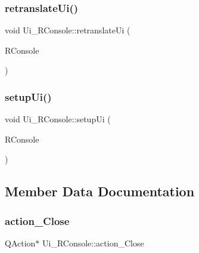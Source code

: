 \subsubsection{\texorpdfstring{retranslateUi()}{retranslateUi()}}
{\footnotesize\ttfamily void Ui\+\_\+\+R\+Console\+::retranslate\+Ui (\begin{DoxyParamCaption}\item[{Q\+Main\+Window $\ast$}]{R\+Console }\end{DoxyParamCaption})\hspace{0.3cm}{\ttfamily [inline]}}

\mbox{\label{class_ui___r_console_a2df0458dc50701360bbf16f2c7e4b7e4}} 
\subsubsection{\texorpdfstring{setupUi()}{setupUi()}}
{\footnotesize\ttfamily void Ui\+\_\+\+R\+Console\+::setup\+Ui (\begin{DoxyParamCaption}\item[{Q\+Main\+Window $\ast$}]{R\+Console }\end{DoxyParamCaption})\hspace{0.3cm}{\ttfamily [inline]}}



\subsection{Member Data Documentation}
\mbox{\label{class_ui___r_console_a9e3d3ed4bf54512777f789cbb07904d2}} 
\subsubsection{\texorpdfstring{action\_Close}{action\_Close}}
{\footnotesize\ttfamily Q\+Action$\ast$ Ui\+\_\+\+R\+Console\+::action\+\_\+\+Close}

\mbox{\label{class_ui___r_console_af98f519656368c4ee9e8494885ff3e92}} 
